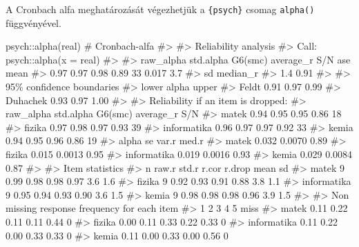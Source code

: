 \documentclass[
  letterpaper,
]{krantz}
\makeatletter
\newenvironment{Shaded}{\begin{snugshade}}{\end{snugshade}}
\newcommand{\CommentTok}[1]{\textcolor[rgb]{0.37,0.37,0.37}{#1}}
\newcommand{\FunctionTok}[1]{\textcolor[rgb]{0.28,0.35,0.67}{#1}}
\newcommand{\NormalTok}[1]{\textcolor[rgb]{0.00,0.23,0.31}{#1}}
\newcommand{\SpecialCharTok}[1]{\textcolor[rgb]{0.37,0.37,0.37}{#1}}
\newenvironment{kframe}{%
\medskip{}
\setlength{\fboxsep}{.8em}
 \def\at@end@of@kframe{}%
 \ifinner\ifhmode%
  \def\at@end@of@kframe{\end{minipage}}%
  \begin{minipage}{\columnwidth}%
 \fi\fi%
 \def\FrameCommand##1{\hskip\@totalleftmargin \hskip-\fboxsep
 \colorbox{shadecolor}{##1}\hskip-\fboxsep
     \hskip-\linewidth \hskip-\@totalleftmargin \hskip\columnwidth}%
 \MakeFramed {\advance\hsize-\width
   \@totalleftmargin\z@ \linewidth\hsize
   \@setminipage}}%
 {\par\unskip\endMakeFramed%
 \at@end@of@kframe}
\renewenvironment{Shaded}{\begin{kframe}}{\end{kframe}}
\makeatother
\begin{document}
A Cronbach alfa meghatározását végezhetjük a \texttt{\{psych\}} csomag
\texttt{alpha()} függvényével.

\begin{Shaded}
\begin{Highlighting}[]
\NormalTok{psych}\SpecialCharTok{::}\FunctionTok{alpha}\NormalTok{(real)  }\CommentTok{\# Cronbach{-}alfa}
\CommentTok{\#\textgreater{} }
\CommentTok{\#\textgreater{} Reliability analysis   }
\CommentTok{\#\textgreater{} Call: psych::alpha(x = real)}
\CommentTok{\#\textgreater{} }
\CommentTok{\#\textgreater{}   raw\_alpha std.alpha G6(smc) average\_r S/N   ase mean}
\CommentTok{\#\textgreater{}       0.97      0.97    0.98      0.89  33 0.017  3.7}
\CommentTok{\#\textgreater{}   sd median\_r}
\CommentTok{\#\textgreater{}  1.4     0.91}
\CommentTok{\#\textgreater{} }
\CommentTok{\#\textgreater{}     95\% confidence boundaries }
\CommentTok{\#\textgreater{}          lower alpha upper}
\CommentTok{\#\textgreater{} Feldt     0.91  0.97  0.99}
\CommentTok{\#\textgreater{} Duhachek  0.93  0.97  1.00}
\CommentTok{\#\textgreater{} }
\CommentTok{\#\textgreater{}  Reliability if an item is dropped:}
\CommentTok{\#\textgreater{}             raw\_alpha std.alpha G6(smc) average\_r S/N}
\CommentTok{\#\textgreater{} matek            0.94      0.95    0.95      0.86  18}
\CommentTok{\#\textgreater{} fizika           0.97      0.98    0.97      0.93  39}
\CommentTok{\#\textgreater{} informatika      0.96      0.97    0.97      0.92  33}
\CommentTok{\#\textgreater{} kemia            0.94      0.95    0.96      0.86  19}
\CommentTok{\#\textgreater{}             alpha se  var.r med.r}
\CommentTok{\#\textgreater{} matek          0.032 0.0070  0.89}
\CommentTok{\#\textgreater{} fizika         0.015 0.0013  0.95}
\CommentTok{\#\textgreater{} informatika    0.019 0.0016  0.93}
\CommentTok{\#\textgreater{} kemia          0.029 0.0084  0.87}
\CommentTok{\#\textgreater{} }
\CommentTok{\#\textgreater{}  Item statistics }
\CommentTok{\#\textgreater{}             n raw.r std.r r.cor r.drop mean  sd}
\CommentTok{\#\textgreater{} matek       9  0.99  0.98  0.98   0.97  3.6 1.6}
\CommentTok{\#\textgreater{} fizika      9  0.92  0.93  0.91   0.88  3.8 1.1}
\CommentTok{\#\textgreater{} informatika 9  0.95  0.94  0.93   0.90  3.6 1.5}
\CommentTok{\#\textgreater{} kemia       9  0.98  0.98  0.98   0.96  3.9 1.5}
\CommentTok{\#\textgreater{} }
\CommentTok{\#\textgreater{} Non missing response frequency for each item}
\CommentTok{\#\textgreater{}                1    2    3    4    5 miss}
\CommentTok{\#\textgreater{} matek       0.11 0.22 0.11 0.11 0.44    0}
\CommentTok{\#\textgreater{} fizika      0.00 0.11 0.33 0.22 0.33    0}
\CommentTok{\#\textgreater{} informatika 0.11 0.22 0.00 0.33 0.33    0}
\CommentTok{\#\textgreater{} kemia       0.11 0.00 0.33 0.00 0.56    0}
\end{Highlighting}
\end{Shaded}
\end{document}
